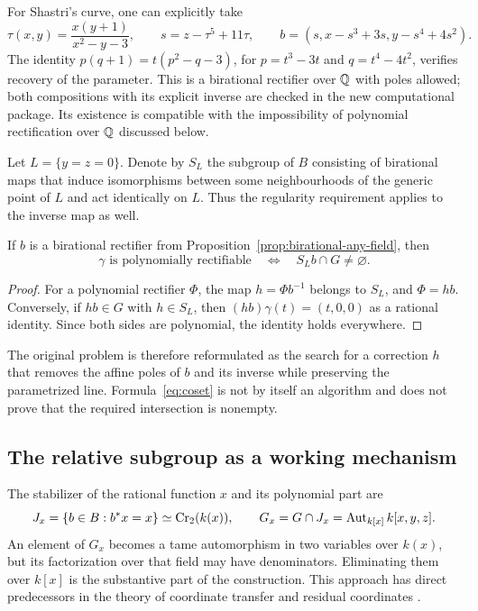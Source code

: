 For Shastri's curve, one can explicitly take
\[
 \tau(x,y)=\frac{x(y+1)}{x^2-y-3},\qquad
 s=z-\tau^5+11\tau,\qquad
 b=(s,x-s^3+3s,y-s^4+4s^2).
\]
The identity $p(q+1)=t(p^2-q-3)$, for $p=t^3-3t$ and
$q=t^4-4t^2$, verifies recovery of the parameter. This is a
birational rectifier over ${\mathbb Q}$ with poles allowed; both
compositions with its explicit inverse are checked in the new
computational package. Its existence is compatible with the
impossibility of polynomial rectification over ${\mathbb Q}$ discussed below.

Let $L=\{y=z=0\}$. Denote by $S_L$ the subgroup of $B$ consisting
of birational maps that induce isomorphisms between some
neighbourhoods of the generic point of $L$ and act identically
on $L$. Thus the regularity requirement applies to the inverse
map as well.

\begin{proposition}\label{prop:coset}
If $b$ is a birational rectifier from
Proposition~\ref{prop:birational-any-field}, then
\begin{equation}\label{eq:coset}
 \gamma\text{ is polynomially rectifiable}
 \quad\Longleftrightarrow\quad S_Lb\cap G\ne\varnothing.
\end{equation}
\end{proposition}
\begin{proof}
For a polynomial rectifier $\Phi$, the map $h=\Phi b^{-1}$
belongs to $S_L$, and $\Phi=hb$. Conversely, if $hb\in G$ with
$h\in S_L$, then $(hb)\gamma(t)=(t,0,0)$ as a rational identity.
Since both sides are polynomial, the identity holds everywhere.
\end{proof}
The original problem is therefore reformulated as the search for
a correction $h$ that removes the affine poles of $b$ and its
inverse while preserving the parametrized line.
Formula~\eqref{eq:coset} is not by itself an algorithm and does
not prove that the required intersection is nonempty.

\subsection{The relative subgroup as a working mechanism}

The stabilizer of the rational function $x$ and its polynomial
part are
\[
 J_x=\{b\in B:b^*x=x\}\simeq\operatorname{Cr}_2(k(x)),\qquad
 G_x=G\cap J_x=\operatorname{Aut}_{k[x]}k[x,y,z].
\]
An element of $G_x$ becomes a tame automorphism in two variables
over $k(x)$, but its factorization over that field may have
denominators. Eliminating them over $k[x]$ is the substantive
part of the construction. This approach has direct predecessors
in the theory of coordinate transfer and residual coordinates
\cite{EV2001,Lewis2024}.

